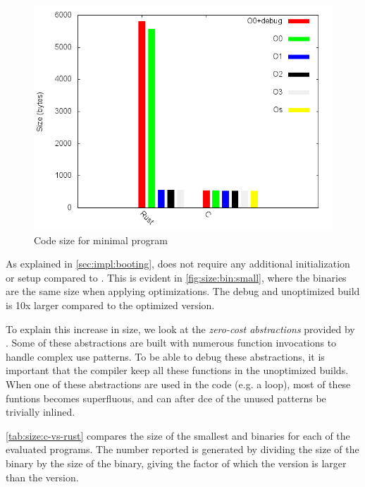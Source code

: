 \begin{figure}[H]
  \begin{center}
    \includegraphics[scale=0.5]{results/plots/size/bin/small/size.png}
  \end{center}
  \caption{Code size for minimal program}
  \label{fig:size:bin:small}
\end{figure}

As explained in \autoref{sec:impl:booting}, {\rust} does not require any additional initialization or setup compared to {\C}.
This is evident in \autoref{fig:size:bin:small}, where the binaries are the same size when applying optimizations.
The debug and unoptimized {\rust} build is 10x larger compared to the optimized version.

To explain this increase in size, we look at the \emph{zero-cost abstractions} provided by {\rust}.
Some of these abstractions are built with numerous function invocations to handle complex use patterns.
To be able to debug these abstractions, it is important that the compiler keep all these functions in the unoptimized builds.
When one of these abstractions are used in the code (e.g. a  loop), most of these funtions becomes superfluous, and can after \gls{dce} of the unused patterns be trivially inlined.

\autoref{tab:size:c-vs-rust} compares the size of the smallest {\C} and {\rust} binaries for each of the evaluated programs.
The number reported is generated by dividing the size of the {\rust} binary by the size of the {\C} binary, giving the factor of which the {\rust} version is larger than the {\C} version.

